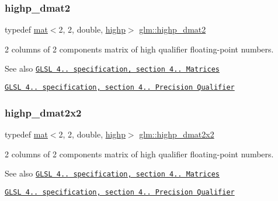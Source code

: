 \subsubsection{\texorpdfstring{highp\+\_\+dmat2}{highp\_dmat2}}
{\footnotesize\ttfamily typedef \hyperlink{structglm_1_1mat}{mat}$<$2, 2, double, \hyperlink{namespaceglm_a36ed105b07c7746804d7fdc7cc90ff25ac6f7eab42eacbb10d59a58e95e362074}{highp}$>$ \hyperlink{group__core__precision_ga10defb0dfd989f948d6783e2ca3889d3}{glm\+::highp\+\_\+dmat2}}

2 columns of 2 components matrix of high qualifier floating-\/point numbers.

\begin{DoxySeeAlso}{See also}
\href{http://www.opengl.org/registry/doc/GLSLangSpec.4.20.8.pdf}{\tt G\+L\+SL 4.. specification, section 4.. Matrices} 

\href{http://www.opengl.org/registry/doc/GLSLangSpec.4.20.8.pdf}{\tt G\+L\+SL 4.. specification, section 4.. Precision Qualifier} 
\end{DoxySeeAlso}
\mbox{\label{group__core__precision_gad08aec6bf6b5ae7d486fbabb3b28f904}} 
\subsubsection{\texorpdfstring{highp\+\_\+dmat2x2}{highp\_dmat2x2}}
{\footnotesize\ttfamily typedef \hyperlink{structglm_1_1mat}{mat}$<$2, 2, double, \hyperlink{namespaceglm_a36ed105b07c7746804d7fdc7cc90ff25ac6f7eab42eacbb10d59a58e95e362074}{highp}$>$ \hyperlink{group__core__precision_gad08aec6bf6b5ae7d486fbabb3b28f904}{glm\+::highp\+\_\+dmat2x2}}

2 columns of 2 components matrix of high qualifier floating-\/point numbers.

\begin{DoxySeeAlso}{See also}
\href{http://www.opengl.org/registry/doc/GLSLangSpec.4.20.8.pdf}{\tt G\+L\+SL 4.. specification, section 4.. Matrices} 

\href{http://www.opengl.org/registry/doc/GLSLangSpec.4.20.8.pdf}{\tt G\+L\+SL 4.. specification, section 4.. Precision Qualifier} 
\end{DoxySeeAlso}
\mbox{\label{group__core__precision_gad7de433cb7f79959a191fc5c64fbfc4e}} 
